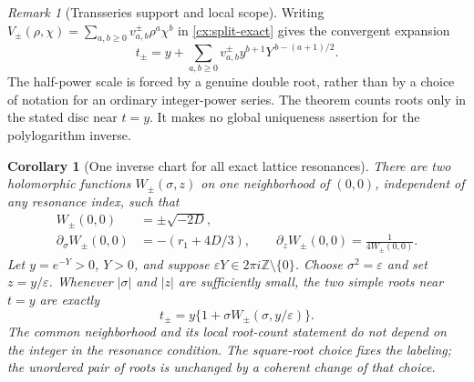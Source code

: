 \documentclass[11pt,a4paper]{article}
\numberwithin{equation}{section}
\newtheorem{corollary}[theorem]{Corollary}
\theoremstyle{definition}
\theoremstyle{remark}
\newtheorem{remark}[theorem]{Remark}
\begin{document}
\begin{remark}[Transseries support and local scope]\label{cx:support}
Writing $V_\pm(\rho,\chi)=\sum_{a,b\ge0}v^{\pm}_{a,b}\rho^a\chi^b$
in \eqref{cx:split-exact} gives the convergent expansion
\[
 t_\pm=y+\sum_{a,b\ge0}v^{\pm}_{a,b}
             y^{b+1}Y^{\,b-(a+1)/2}.
\]
The half-power scale is forced by a genuine double root, rather than by a
choice of notation for an ordinary integer-power series.  The theorem
counts roots only in the stated disc near $t=y$.  It makes no global
uniqueness assertion for the polylogarithm inverse.
\end{remark}

\begin{corollary}[One inverse chart for all exact lattice resonances]
\label{cx:uniform-lattice-splitting}
There are two holomorphic functions $W_\pm(\sigma,z)$ on one neighborhood
of $(0,0)$, independent of any resonance index, such that
\begin{align}
 W_\pm(0,0)&=\pm\sqrt{-2D},\label{cx:uniform-W0}\\
 \partial_\sigma W_\pm(0,0)&=-(r_1+4D/3),\qquad
 \partial_z W_\pm(0,0)=\frac1{4W_\pm(0,0)}.
 \label{cx:uniform-W-first}
\end{align}
Let $y=e^{-Y}>0$, $Y>0$, and suppose
$\varepsilon Y\in2\pi i\mathbb Z\setminus\{0\}$. Choose
$\sigma^2=\varepsilon$ and set $z=y/\varepsilon$. Whenever
$|\sigma|$ and $|z|$ are sufficiently small, the two simple roots near
$t=y$ are exactly
\begin{equation}\label{cx:uniform-lattice-roots}
 t_\pm=y\{1+\sigma W_\pm(\sigma,y/\varepsilon)\}.
\end{equation}
The common neighborhood and its local root-count statement do not depend
on the integer in the resonance condition. The square-root choice fixes
the labeling; the unordered pair of roots is unchanged by a coherent
change of that choice.
\end{corollary}
\end{document}
